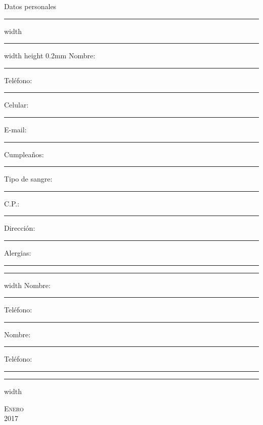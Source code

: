 \documentclass[portrait]{article}
\newcommand\blankpage{%
\null 
\thispagestyle{empty}%
\addtocounter{page}{-1}%
\newpage}
\begin{document}
 
\pagestyle{empty} %
\noindent 
{\Huge Datos personales} \hfill \break\hrule depth 0.3mm width \hsize \kern 1pt \hrule width \hsize height 0.2mm \hfill \break 
 \hfill \break 
{\large Nombre:} {\color{Dandelion}\rule{9.4cm}{0.1mm}}\hfill \break 
{\large Tel\'efono:} {\color{Dandelion}\rule{9.2cm}{0.1mm}}\hfill \break 
{\large Celular:} {\color{Dandelion}\rule{9.5cm}{0.1mm}}\hfill \break 
{\large E-mail:} {\color{Dandelion}\rule{9.6cm}{0.1mm}}\hfill \break 
{\large Cumplea\~nos:} {\color{Dandelion}\rule{8.7cm}{0.1mm}}\hfill \break 
{\large Tipo de sangre:} {\color{Dandelion}\rule{3.5cm}{0.1mm}}  
C.P.: {\color{Dandelion}\rule{3.8cm}{0.1mm}}\hfill \break 
{\large Direcci\'on:} {\color{Dandelion}\rule{9.1cm}{0.1mm}}\hfill \break 
{\large Alergias:} {\color{Dandelion}\rule{9.3cm}{0.1mm}} \hfill \break \hfill \break\hfill {} \hfill \break\hrule width \hsize \kern 2pt \hfill \break 
 \hfill \break 
{\large Nombre:} {\color{Dandelion}\rule{9.4cm}{0.1mm}}\hfill \break 
{\large Tel\'efono:} {\color{Dandelion}\rule{9.2cm}{0.1mm}} \hfill \break\hfill \break 
{\large Nombre:} {\color{Dandelion}\rule{9.4cm}{0.1mm}}\hfill \break 
{\large Tel\'efono:} {\color{Dandelion}\rule{9.2cm}{0.1mm}} \hfill \break \hfill {} \hfill \break\hrule width \hsize \kern 2pt \hfill \break 
 \afterpage{\blankpage}\newpage {}\pagestyle{empty} %
\noindent 
{} %
\begin{center} 
\textsc{\Huge \color{Dandelion}Enero}\\ %
\textsc{\large 2017} %
\end{center} 
\end{document}
